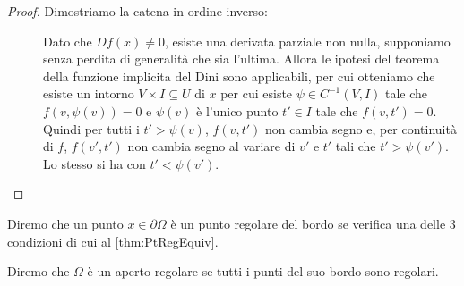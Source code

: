 \begin{proof}
	Dimostriamo la catena in ordine inverso:
	\begin{description}
		\item [] Dato che $Df(x)\neq 0$, esiste una derivata parziale non nulla, supponiamo senza perdita di
			generalità che sia l'ultima. Allora le ipotesi del teorema della funzione implicita del Dini sono applicabili, per cui
			otteniamo che esiste un intorno $V\times I\subseteq U$ di $x$ per cui esiste $\psi\in C^{-1}(V,I)$ tale che $f(v,\psi(v))=0$
			e $\psi(v)$ è l'unico punto $t'\in I$ tale che $f(v,t')=0$. Quindi per tutti i $t'>\psi(v)$, $f(v,t')$ non cambia segno e,
			per continuità di $f$, $f(v',t')$ non cambia segno al variare di $v'$ e $t'$ tali che $t'>\psi(v')$. Lo stesso si ha con 
			$t'<\psi(v')$. 
		\item []
		\item []
	\end{description}

\end{proof}


\begin{definition}
	Diremo che un punto $x\in \partial \Omega$ è un punto regolare del bordo se verifica una delle $3$ condizioni di cui
	al \cref{thm:PtRegEquiv}.
\end{definition}

\begin{definition}
	Diremo che $\Omega$ è un aperto regolare se tutti i punti del suo bordo sono regolari.
\end{definition}

